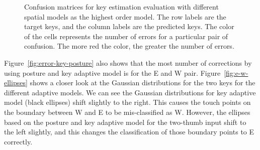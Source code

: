 \documentclass{sigchi}
\begin{document}
\begin{figure}[tb]
{    \label{fig:error-key-posture}
  }
  \caption{Confusion matrices for key estimation evaluation with different
  spatial models as the highest order model. The row labels are the
  target keys, and the column labels are the predicted keys.  The color of the cells
represents the number of errors for a particular pair of confusion. The more red the color,
the greater the number of errors.}
  \label{fig:confusion-matrices}
\end{figure}

Figure~\ref{fig:error-key-posture} also shows that the most number of
corrections by using posture and key adaptive model is for the E and W pair. Figure~\ref{fig:e-w-ellipses}
shows a closer look at the Gaussian distributions for the two keys for the different
adaptive models. We can see the Gaussian distributions for key adaptive model (black ellipses) shift slightly to the right. This causes the touch points on the boundary between W and 
E to be mis-classified as W. However, the ellipses based on the posture and key
adaptive model for the two-thumb input shift to the left slightly, and this changes
the classification of those boundary points to E correctly.
\end{document}
